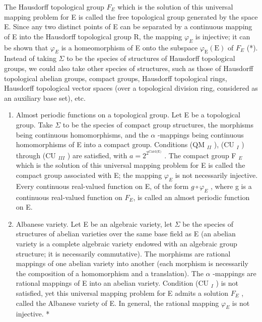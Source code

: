 The Hausdorff topological group \(F_{E}\) which is the solution of this universal mapping problem for E is called the free topological group generated by the space E. Since any two distinct points of E can be separated by a continuous mapping of E into the Hausdorff topological group R, the mapping \(\varphi_{E}\) is injective; it can be shown that \(\varphi_{E}\) is a homeomorphism of E onto the subspace \(\varphi_{\mathrm{E}}(\mathrm{E})\) of \(F_{E}\) (*). Instead of taking \(\Sigma\) to be the species of structures of Hausdorff topological groups, we could also take other species of structures, such as those of Hausdorff topological abelian groups, compact groups, Hausdorff topological rings, Hausdorff topological vector spaces (over a topological division ring, considered as an auxiliary base set), etc.

\begin{enumerate}
\def\labelenumi{\Roman{enumi}.}
\setcounter{enumi}{7}
\item
  Almost periodic functions on a topological group. Let E be a topological group. Take \(\Sigma\) to be the species of compact group structures, the morphisms being continuous homomorphisms, and the \(\alpha\) -mappings being continuous homomorphisms of E into a compact group. Conditions (QM \(_{II}\) ), (CU \(_{I}\) ) through (CU \(_{III}\) ) are satisfied, with \(a = 2^{2^{\text{Card(E)}}}\) . The compact group F \(_{E}\) which is the solution of this universal mapping problem for E is called the compact group associated with E; the mapping \(\varphi_{E}\) is not necessarily injective. Every continuous real-valued function on E, of the form \(g \circ \varphi_{E}\) , where g is a continuous real-valued function on \(F_E\), is called an almost periodic function on E.
\item
  Albanese variety. Let E be an algebraic variety, let \(\Sigma\) be the species of structures of abelian varieties over the same base field as E (an abelian variety is a complete algebraic variety endowed with an algebraic group structure; it is necessarily commutative). The morphisms are rational mappings of one abelian variety into another (each morphism is necessarily the composition of a homomorphism and a translation). The \(\alpha\) -mappings are rational mappings of E into an abelian variety. Condition (CU \(_{I}\) ) is not satisfied, yet this universal mapping problem for E admits a solution \(F_{E}\) , called the Albanese variety of E. In general, the rational mapping \(\varphi_{E}\) is not injective. *
\end{enumerate}

